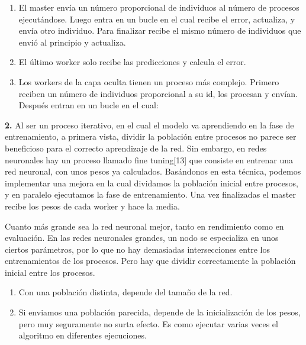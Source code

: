 	\begin{enumerate}
		\item El master envía un número proporcional de individuos al número de procesos ejecutándose. Luego entra en un bucle en el cual recibe el error, actualiza, y envía otro individuo. Para finalizar recibe el mismo número de individuos que envió al principio y actualiza.
		\item El último worker solo recibe las predicciones y calcula el error.
		\item Los workers de la capa oculta tienen un proceso más complejo. Primero reciben un número de individuos proporcional a su id, los procesan y envían. Después entran en un bucle en el cual:			
		
	\end{enumerate}
	
	
	\textbf{2.} Al ser un proceso iterativo, en el cual el modelo va aprendiendo en la fase de entrenamiento, a primera vista, dividir la población entre procesos no parece ser beneficioso para el correcto aprendizaje de la red. Sin embargo, en redes neuronales hay un proceso llamado fine tuning[13] que consiste en entrenar una red neuronal, con unos pesos ya calculados. Basándonos en esta técnica, podemos implementar una mejora en la cual dividamos la población inicial entre procesos, y en paralelo ejecutamos la fase de entrenamiento. Una vez finalizadas el master recibe los pesos de cada worker y hace la media. 
	
	Cuanto más grande sea la red neuronal mejor, tanto en rendimiento como en evaluación. En las redes neuronales grandes, un nodo se especializa en unos ciertos parámetros, por lo que no hay demasiadas intersecciones entre los entrenamientos de los procesos. Pero hay que dividir correctamente la población inicial entre los procesos. 
	
	\begin{enumerate}
		\item Con una población distinta, depende del tamaño de la red. 
		\item Si enviamos una población parecida, depende de la inicialización de los pesos, pero muy seguramente no surta efecto. Es como ejecutar varias veces el algoritmo en diferentes ejecuciones.
		
	\end{enumerate}	
	
